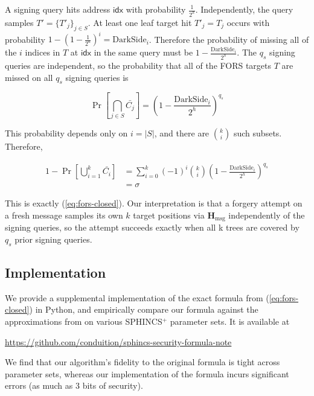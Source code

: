 \documentclass[11pt]{article}
\newcommand{\spx}{SPHINCS$^+$\xspace}
\begin{document}
A signing query hits address $\mathsf{idx}$ with probability $\frac{1}{2^h}$. Independently, the query samples $T' = \{T'_j\}_{j \in S}$. At least one leaf target hit $T'_j = T_j$ occurs with probability $1 - \left( 1 - \frac{1}{2^a} \right)^i = \mathrm{DarkSide}_i$. Therefore the probability of missing all of the $i$ indices in $T$ at $\mathsf{idx}$ in the same query must be $1 - \frac{\mathrm{DarkSide}_i}{2^h}$. The $q_s$ signing queries are independent, so the probability that all of the FORS targets $T$ are missed on all $q_s$ signing queries is

\begin{equation}
  \Pr \left[ \bigcap_{j \in S} \bar{C_j} \right] = \left( 1 - \frac{\mathrm{DarkSide}_i}{2^h} \right)^{q_s}
\end{equation}

This probability depends only on $i = |S|$, and there are $\binom{k}{i}$ such subsets. Therefore,

\begin{align}
  1 - \Pr \left[ \bigcup_{i=1}^k \bar{C_i} \right]
    &= \sum_{i=0}^k (-1)^{i} \binom{k}{i} \left( 1 - \frac{\mathrm{DarkSide}_i}{2^h} \right)^{q_s} \\
    &= \sigma
\end{align}

This is exactly (\ref{eq:fors-closed}). Our interpretation is that a forgery attempt on a fresh message samples its own $k$ target positions via $\mathbf{H}_\text{msg}$ independently of the signing queries, so the attempt succeeds exactly when all k trees are covered by $q_s$ prior signing queries.


\subsection{Implementation}

We provide a supplemental implementation of the exact formula from (\ref{eq:fors-closed}) in Python, and empirically compare our formula against the approximations from \cite{sphincsplus, smaller_sphincs} on various \spx parameter sets. It is available at

\url{https://github.com/conduition/sphincs-security-formula-note}

\medskip

We find that our algorithm's fidelity to the original \cite{sphincsplus} formula is tight across parameter sets, whereas our implementation of the \cite{smaller_sphincs} formula incurs significant errors (as much as 3 bits of security).
\end{document}
